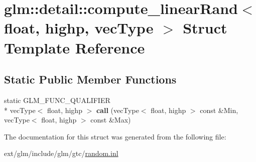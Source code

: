 \hypertarget{structglm_1_1detail_1_1compute__linear_rand_3_01float_00_01highp_00_01vec_type_01_4}{\section{glm\-:\-:detail\-:\-:compute\-\_\-linear\-Rand$<$ float, highp, vec\-Type $>$ Struct Template Reference}
\label{structglm_1_1detail_1_1compute__linear_rand_3_01float_00_01highp_00_01vec_type_01_4}
}
\subsection*{Static Public Member Functions}
\begin{DoxyCompactItemize}
\item 
\hypertarget{structglm_1_1detail_1_1compute__linear_rand_3_01float_00_01highp_00_01vec_type_01_4_a1ac79c6d4365ce29a99e45327d51ec47}{static G\-L\-M\-\_\-\-F\-U\-N\-C\-\_\-\-Q\-U\-A\-L\-I\-F\-I\-E\-R \\*
vec\-Type$<$ float, highp $>$ {\bfseries call} (vec\-Type$<$ float, highp $>$ const \&Min, vec\-Type$<$ float, highp $>$ const \&Max)}\label{structglm_1_1detail_1_1compute__linear_rand_3_01float_00_01highp_00_01vec_type_01_4_a1ac79c6d4365ce29a99e45327d51ec47}

\end{DoxyCompactItemize}


The documentation for this struct was generated from the following file\-:\begin{DoxyCompactItemize}
\item 
ext/glm/include/glm/gtc/\hyperlink{random_8inl}{random.\-inl}\end{DoxyCompactItemize}
